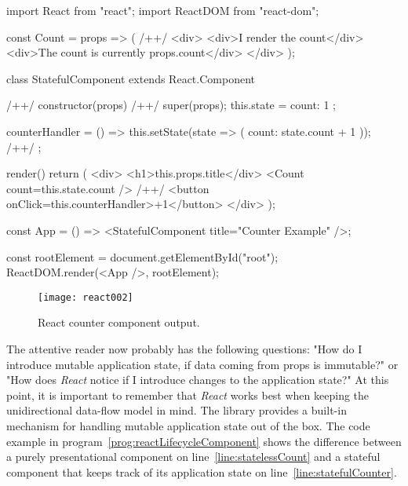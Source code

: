 \begin{program}
\caption{Simple example of a \emph{React} component and its usage.} 
\label{prog:reactStateful}
\begin{JsCode}
import React from "react";
import ReactDOM from "react-dom";

const Count = props => ( /+\label{line:statelessCount}+/
  <div>
    <div>I render the count</div>
    <div>The count is currently {props.count}</div>
  </div>
);

class StatefulComponent extends React.Component { /+\label{line:statefulCounter}+/
  constructor(props) { /+\label{line:statefulConstructor}+/
    super(props);
    this.state = {
      count: 1
    };
  }

  counterHandler = () => {
    this.setState(state => ({ count: state.count + 1 })); /+\label{line:setState}+/
  };

  render() {
    return (
      <div>
        <h1>{this.props.title}</div>
        <Count count={this.state.count} /> /+\label{line:currentStateUsage}+/
        <button onClick={this.counterHandler}>+1</button>
      </div>
    );
  }
}

const App = () => <StatefulComponent title={"Counter Example"} />;

const rootElement = document.getElementById("root");
ReactDOM.render(<App />, rootElement);
\end{JsCode}
\end{program}

\begin{figure}
  \centering
  \texttt{[image: react002]}
  \caption{React counter component output.}
  \label{fig:reactCounterComponent}
\end{figure}

The attentive reader now probably has the following questions: "How do I introduce mutable application state, if data coming from props is immutable?" or "How does \emph{React} notice if I introduce changes to the application state?" At this point, it is important to remember that \emph{React} works best when keeping the unidirectional data-flow model in mind. The library provides a built-in mechanism for handling mutable application state out of the box. The code example in program~\ref{prog:reactLifecycleComponent} shows the difference between a purely presentational component on line~\ref{line:statelessCount} and a stateful component that keeps track of its application state on line~\ref{line:statefulCounter}.

